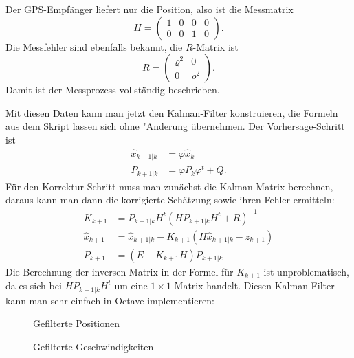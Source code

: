 \begin{loesung}
Der GPS-Empfänger liefert nur die Position, also ist die Messmatrix
\[
H=
\begin{pmatrix}
1&0&0&0\\
0&0&1&0
\end{pmatrix}.
\]
Die Messfehler sind ebenfalls bekannt, die $R$-Matrix ist
\[
R=\begin{pmatrix}
\varrho^2&0\\
0&\varrho^2
\end{pmatrix}.
\]
Damit ist der Messprozess vollständig beschrieben.

Mit diesen Daten kann man jetzt den Kalman-Filter konstruieren, die
Formeln aus dem Skript lassen sich ohne "Anderung übernehmen.
Der Vorhersage-Schritt ist
\begin{align*}
\hat x_{k+1|k}&=\varphi \hat x_k
\\
P_{k+1|k}&=\varphi P_k\varphi^t+Q.
\end{align*}
Für den Korrektur-Schritt muss man zunächst die Kalman-Matrix 
berechnen, daraus kann man dann die korrigierte Schätzung sowie
ihren Fehler ermitteln:
\begin{align*}
K_{k+1}&=P_{k+1|k}H^t(HP_{k+1|k}H^t+R)^{-1}
\\
\hat x_{k+1}&=
\hat x_{k+1|k} - K_{k+1}(H\hat x_{k+1|k}-z_{k+1})
\\
P_{k+1}&=(E-K_{k+1}H)P_{k+1|k}
\end{align*}
Die Berechnung der inversen Matrix in der Formel für $K_{k+1}$ ist
unproblematisch, da es sich bei $HP_{k+1|k}H^t$ um eine $1\times 1$-Matrix
handelt.
Diesen Kalman-Filter kann man sehr einfach in Octave implementieren:
{\small
{}
}
\begin{figure}
\caption{Gefilterte Positionen}
\end{figure}
\begin{figure}
\caption{Gefilterte Geschwindigkeiten}
\end{figure}
\end{loesung}


